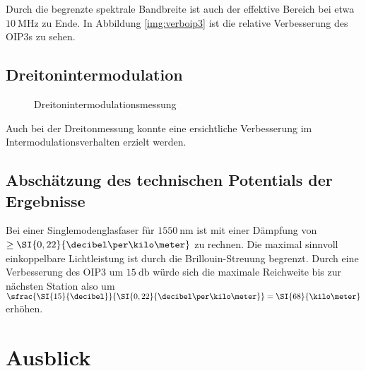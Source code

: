 Durch die begrenzte spektrale Bandbreite ist auch der effektive Bereich bei etwa $\SI{10}{\mega\hertz}$ zu Ende. In Abbildung \ref{img:verboip3} ist die relative Verbesserung des \ac{OIP3}s zu sehen.

\subsection{Dreitonintermodulation}

\begin{figure}[H]
\raggedright
\raggedleft
\caption{Dreitonintermodulationsmessung} 
\label{img:inter3}
\end{figure}

Auch bei der Dreitonmessung konnte eine ersichtliche Verbesserung im Intermodulationsverhalten erzielt werden.

\subsection{Abschätzung des technischen Potentials der Ergebnisse}

Bei einer Singlemodenglasfaser für $\SI{1550}{\nano\meter}$ ist mit einer Dämpfung von $\ge\SI{0,{}22}{\decibel\per\kilo\meter}$ zu rechnen. Die maximal sinnvoll einkoppelbare Lichtleistung ist durch die Brillouin-Streuung \cite{brill} begrenzt. Durch eine Verbesserung des \ac{OIP3} um $\SI{15}{\decibel}$ würde sich die maximale Reichweite bis zur nächsten Station also um $\sfrac{\SI{15}{\decibel}}{\SI{0,{}22}{\decibel\per\kilo\meter}}=\SI{68}{\kilo\meter}$ erhöhen.

\section{Ausblick}

